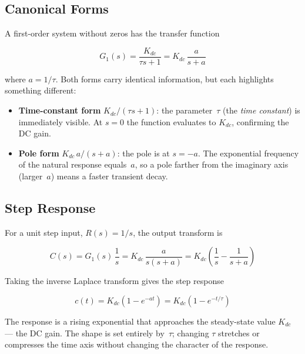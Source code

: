\documentclass[12pt]{article}
\begin{document}
\subsection{Canonical Forms}
\label{sec:first_forms}

A first-order system without zeros has the transfer function

\begin{equation}
  G_1(s) = \frac{K_{dc}}{\tau s + 1} = K_{dc}\,\frac{a}{s+a}
  \label{eq:G1}
\end{equation}

where $a = 1/\tau$.  Both forms carry identical information, but each
highlights something different:

\begin{itemize}
  \item \textbf{Time-constant form} $K_{dc}/(\tau s+1)$: the parameter~$\tau$
    (the \emph{time constant}) is immediately visible.  At $s=0$ the function
    evaluates to $K_{dc}$, confirming the DC gain.
  \item \textbf{Pole form} $K_{dc}\,a/(s+a)$: the pole is at $s = -a$.  The
    exponential frequency of the natural response equals~$a$, so a pole farther
    from the imaginary axis (larger~$a$) means a faster transient decay.
\end{itemize}

\subsection{Step Response}
\label{sec:first_step}

For a unit step input, $R(s) = 1/s$, the output transform is

\[
  C(s) = G_1(s)\,\frac{1}{s} = K_{dc}\,\frac{a}{s(s+a)}
       = K_{dc}\left(\frac{1}{s} - \frac{1}{s+a}\right)
\]

Taking the inverse Laplace transform gives the step response

\begin{equation}
  \boxed{c(t) = K_{dc}\!\left(1 - e^{-at}\right) = K_{dc}\!\left(1 - e^{-t/\tau}\right)}
  \label{eq:first_step}
\end{equation}

The response is a rising exponential that approaches the steady-state value
$K_{dc}$ --- the DC gain.  The shape is set entirely by~$\tau$; changing $\tau$
stretches or compresses the time axis without changing the character of the
response.
\end{document}
